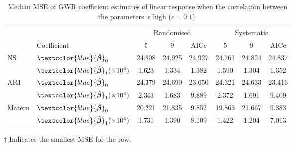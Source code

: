 \documentclass[a4paper]{article} 	%
\newcommand{\Matern}{Mat\'ern }
\newcommand{\zc}[1]{\textcolor{blue}{#1}}
\begin{document}
\begin{table}[!htp]
	\centering
\begin{threeparttable}
	\caption{Median MSE of GWR coefficient estimates of linear response when the correlation between the parameters is high ($\epsilon=0.1$).}\label{tb:MSElinearHigh}
	\begin{tabular}{llcccccc}
		\toprule
		&  & \multicolumn{3}{c}{Randomised} & \multicolumn{3}{c}{Systematic} \\ 
   		 & Coefficient & 5  &  9  & AICc & 5   & 9  & AICc \\ \midrule
		\multirow{2}{*}{NS}   & $\zc{\hat{\bm{\beta}}}_0$ & 24.808 &	24.925 &	24.927&	24.761\tnote{$\dagger$}  &	24.824 &	24.837 \\ 
		& $\zc{\hat{\bm{\beta}}}_1 (\times 10^4)$ & 1.623 &	1.334 &	1.382 &	1.590 &	1.304\tnote{$\dagger$}  &	1.352 \\  \midrule
		\multirow{2}{*}{AR1}  & $\zc{\hat{\bm{\beta}}}_0$ & 24.379 &	24.690 &	23.650 &	24.321\tnote{$\dagger$}  &	24.633 &	23.416 \\ 
		& $\zc{\hat{\bm{\beta}}}_1 (\times 10^4)$ & 2.343 &	1.683\tnote{$\dagger$}  &	9.889 &	2.372 &	1.691 &	9.409 \\ \midrule
		\multirow{2}{*}{\Matern} & $\zc{\hat{\bm{\beta}}}_0$ & 20.221 &	21.835 &	9.852 &	19.863 &	21.667 &	9.383\tnote{$\dagger$}  \\ 
		& $\zc{\hat{\bm{\beta}}}_1 (\times 10^4)$ & 1.731 &	1.390 &	8.109 &	1.422 &	1.204\tnote{$\dagger$}  &	7.013 \\
		\bottomrule
	\end{tabular}
	\begin{tablenotes}
	\item[$\dagger$] \footnotesize Indicates the smallest MSE for the row.
	\end{tablenotes}
\end{threeparttable}
\end{table}

\end{document}
